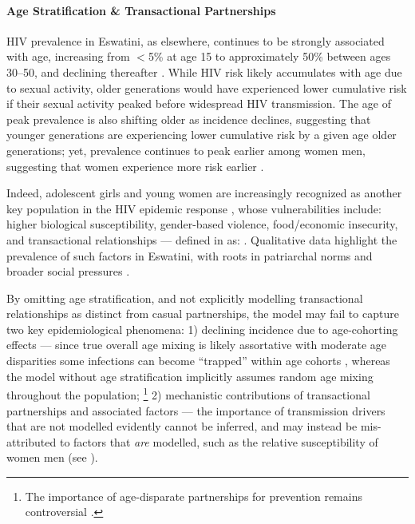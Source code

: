\paragraph{Age Stratification \& Transactional Partnerships}
HIV prevalence in Eswatini, as elsewhere, continues to be strongly associated with age,
increasing from $<$5\% at age 15 to approximately 50\% between ages 30--50,
and declining thereafter \cite{SDHS2006,SHIMS1,SHIMS2}.
While HIV risk likely accumulates with age due to sexual activity,
older generations would have experienced lower cumulative risk
if their sexual activity peaked before widespread HIV transmission.
The age of peak prevalence is also shifting older as incidence declines, suggesting that
younger generations are experiencing lower cumulative risk by a given age \vs older generations;
yet, prevalence continues to peak earlier among women \vs men, suggesting that
women experience more risk earlier \cite{SDHS2006,SHIMS1,SHIMS2}.
\par
Indeed, adolescent girls and young women are increasingly recognized as another key population
in the HIV epidemic response \cite{Dellar2015}, whose vulnerabilities include:
higher biological susceptibility, gender-based violence, food/economic insecurity, and
transactional relationships --- defined in \cite{Stoebenau2016} as:
\cite{Yi2013,Dellar2015,Wamoyi2016}.
Qualitative data highlight the prevalence of such factors in Eswatini,
with roots in patriarchal norms and broader social pressures
\cite{Jones2009,Ruark2014,Fielding-Miller2016,Ruark2019,Pulerwitz2021}.
\par
By omitting age stratification,
and not explicitly modelling transactional relationships as distinct from casual partnerships,
the model may fail to capture two key epidemiological phenomena:
1) declining incidence due to age-cohorting effects ---
since true overall age mixing is likely assortative with moderate age disparities
\cite{Harling2014,Fielding-Miller2016,Pulerwitz2021}
some infections can become ``trapped'' within age cohorts \cite{Beauclair2018},
whereas the model without age stratification implicitly assumes
random age mixing throughout the population;%
\footnote{The importance of age-disparate partnerships for prevention remains controversial
  \cite{Leclerc-Madlala2008,Ott2011,Harling2014}.}
2) mechanistic contributions of transactional partnerships and associated factors ---
the importance of transmission drivers that are not modelled evidently cannot be inferred,
and may instead be mis-attributed to factors that \emph{are} modelled,
such as the relative susceptibility of women \vs men (see ).

